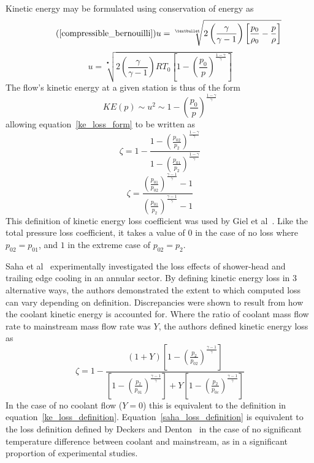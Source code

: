 \documentclass[a4paper, 11pt, oneside]{report}
\begin{document}
Kinetic energy may be formulated using conservation of energy as
\begin{equation}\tag{\ref{compressible_bernouilli}}
u = 
\sqrt[•]{ 
2 \left( \frac{\gamma}{\gamma - 1} \right) \left[ \frac{p_0}{\rho_0} - \frac{p}{\rho} \right] 
}
\end{equation}
\begin{equation}
u =
\sqrt[•]{ 
	2 \left( \frac{\gamma}{\gamma - 1} \right)
	R T_0
	\left[
		1 - \left(
			\frac{p_0}{p}
		\right)
		^\frac{1-\gamma}{\gamma}
	\right] 
}
\end{equation}
The flow's kinetic energy at a given station is thus of the form
\begin{equation}
KE(p) 
\sim
u^2
\sim
1 - \left(
	\frac{p_0}{p}
\right)
^\frac{1-\gamma}{\gamma}
\end{equation}
allowing equation~\ref{ke_loss_form} to be written as
\begin{equation}
\zeta = 
1 - 
\frac{
	1 -
	\left(
		\frac{p_{02}}{p_2}
	\right)
	^\frac{1-\gamma}{\gamma}
}{
	1 -
	\left(
		\frac{p_{01}}{p_2}
	\right)
	^\frac{1-\gamma}{\gamma}
}
\end{equation}
\begin{equation}\label{ke_loss_definition}
\zeta = 
\frac{ 
	\left(
		\frac{p_{01}}{p_{02}}
	\right)
	^\frac{\gamma-1}{ \gamma } - 1 
}{
	\left(
	\frac{p_{01}}{p_{2}}
	\right)
	^\frac{\gamma-1}{ \gamma } - 1 
}
\end{equation}
This definition of kinetic energy loss coefficient was used by Giel et al~\cite{giel_te_thickness}. Like the total pressure loss coefficient, it takes a value of $0$ in the case of no loss where $p_{02} = p_{01}$, and $1$ in the extreme case of $p_{02} = p_2$.

Saha et al~\cite{saha_loss} experimentally investigated the loss effects of shower-head and trailing edge cooling in an annular sector. By defining kinetic energy loss in 3 alternative ways, the authors demonstrated the extent to which computed loss can vary depending on definition. Discrepancies were shown to result from how the coolant kinetic energy is accounted for. Where the ratio of coolant mass flow rate to mainstream mass flow rate was $Y$, the authors defined kinetic energy loss as
\begin{equation}\label{saha_loss_definition}
\zeta = 
1 -
\frac{ 
	\left( 1 + Y \right) 
	\left[
		1 -
		\left(
			\frac{p_2}{p_{02}}
		\right)
		^\frac{\gamma-1}{\gamma}
	\right]
}{
	\left[
		1 -
		\left(
			\frac{p_2}{p_{01}}
		\right)
		^\frac{\gamma-1}{\gamma}
	\right]
	+Y
	\left[
		1 -
		\left(
			\frac{p_2}{p_{0c}}
		\right)
		^\frac{\gamma-1}{\gamma}
	\right]
}
\end{equation}
In the case of no coolant flow ($Y=0$) this is equivalent to the definition in equation~\ref{ke_loss_definition}. Equation~\ref{saha_loss_definition} is equivalent to the loss definition defined by Deckers and Denton~\cite{deckers_loss} in the case of no significant temperature difference between coolant and mainstream, as in a significant proportion of experimental studies.
\end{document}
